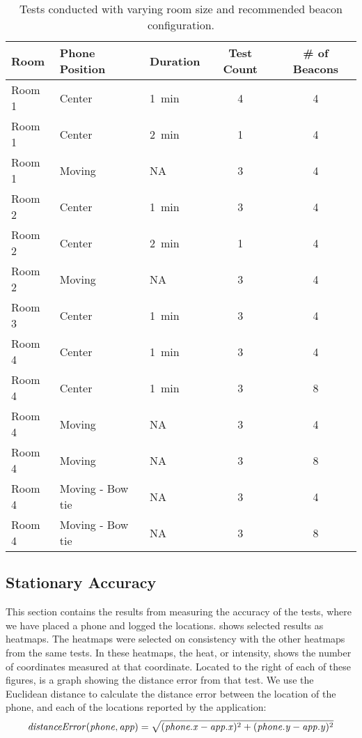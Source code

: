 \begin{table}[!htb]
  \centering
  \begin{tabular}{l| l l c c}
  	Room   & Phone Position   & Duration        & Test Count & \# of Beacons \\ \hline
  	Room 1 & Center           & \SI{1}{\minute} & \num{4}    & \num{4}       \\
  	Room 1 & Center           & \SI{2}{\minute} & \num{1}    & \num{4}       \\
  	Room 1 & Moving           & NA              & \num{3}    & \num{4}       \\
  	Room 2 & Center           & \SI{1}{\minute} & \num{3}    & \num{4}       \\
  	Room 2 & Center           & \SI{2}{\minute} & \num{1}    & \num{4}       \\
  	Room 2 & Moving           & NA              & \num{3}    & \num{4}       \\
  	Room 3 & Center           & \SI{1}{\minute} & \num{3}    & \num{4}       \\
  	Room 4 & Center           & \SI{1}{\minute} & \num{3}    & \num{4}       \\
  	Room 4 & Center           & \SI{1}{\minute} & \num{3}    & \num{8}       \\
  	Room 4 & Moving           & NA              & \num{3}    & \num{4}       \\
  	Room 4 & Moving           & NA              & \num{3}    & \num{8}       \\
  	Room 4 & Moving - Bow tie & NA              & \num{3}    & \num{4}       \\
  	Room 4 & Moving - Bow tie & NA              & \num{3}    & \num{8}
  \end{tabular}
  \caption{Tests conducted with varying room size and recommended beacon configuration.}
  \label{table:precisiontest:roomsize}
\end{table}

\subsection{Stationary Accuracy}
This section contains the results from measuring the accuracy of the tests, 
where we have placed a phone and logged the locations. 
 shows selected results as heatmaps. 
The heatmaps were selected on consistency with the other heatmaps from the same tests.
In these heatmaps, the heat, or intensity, 
shows the number of coordinates measured at that coordinate. 
Located to the right of each of these figures, 
is a graph showing the distance error from that test. 
We use the Euclidean distance to calculate the distance error between the location of the phone, 
and each of the locations reported by the application:
\begin{equation}
 \var{distanceError(phone, app)} = \sqrt{(\var{phone.x} - \var{app.x})^2 + (\var{phone.y} - \var{app.y})^2}
\end{equation}

